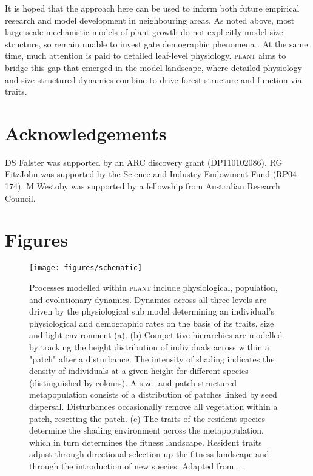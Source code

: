 \documentclass[a4paper,11pt]{article}
\newcommand{\plant}{\textsc{plant}}
\begin{document}
It is hoped that the approach here can be used to inform both future empirical
research and model development in neighbouring areas. As noted above, most
large-scale mechanistic models of plant growth do not explicitly model size
structure, so remain unable to investigate demographic phenomena
\citep{Cramer-2001, Dekauwe-2014, Kelley-2013, Sitch-2003}. At the same time,
much attention is paid to detailed leaf-level physiology. {\plant} aims to bridge
this gap that emerged in the model landscape, where detailed physiology and
size-structured dynamics combine to drive forest structure and function via
traits.

\section{Acknowledgements}

DS Falster was supported by an ARC discovery grant (DP110102086). RG
FitzJohn was supported by the Science and Industry Endowment Fund
(RP04-174). M Westoby was supported by a fellowship from Australian
Research Council.

\clearpage


\clearpage

\section{Figures}\label{figures}

\begin{figure}[h!]
\centering
\texttt{[image: figures/schematic]}

\caption{Processes modelled within {\plant} include physiological, population, and
evolutionary dynamics.
Dynamics across all three levels are driven by the
physiological sub model determining an individual's physiological and
demographic rates on the basis of its traits, size and light environment (a).
(b) Competitive hierarchies  are modelled by tracking the height distribution of
individuals across within a "patch" after a disturbance. The intensity
of shading indicates the density of individuals at a given height for
different species (distinguished by colours). A size- and patch-structured
metapopulation consists of a distribution of patches linked by seed dispersal.
Disturbances occasionally remove all vegetation within a patch, resetting the
patch. (c) The traits of the resident species determine the shading environment
across the metapopulation, which in turn determines the fitness landscape.
Resident traits adjust through directional selection up the fitness landscape
and through the introduction of new species. Adapted from
\citet{Falster-2011}, \citet{Falster-2015}. }

\label{fig:schematic}
\end{figure}
\end{document}
